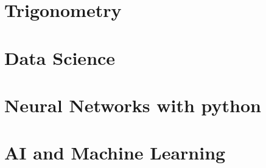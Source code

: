 \documentclass[a4paper,12pt]{book}
\begin{document}
\chapter{Trigonometry}

\chapter{Data Science}

\chapter{Neural Networks with python}

\chapter{AI and Machine Learning}
\end{document}
